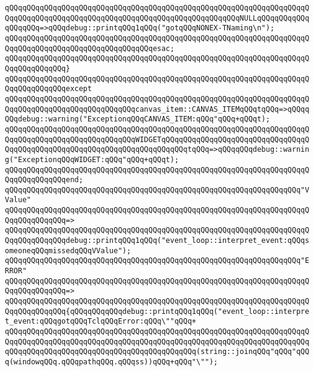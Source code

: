 \verb|qQQqqQQqqQQqqQQqqQQqqQQqqQQqqQQqqQQqqQQqqQQqqQQqqQQqqQQqqQQqqQQqqQQqqQQqqQQqqQQqqQQqqQQqqQQqqQQqqQQqqQQqqQQqqQQqqQQqqQQqqQQqNULLqQQqqQQqqQQqqQQqqQQq=>qQQqdebug::printqQQq1qQQq("gotqQQqNONEX-TNaming\n");|\newline
\verb|qQQqqQQqqQQqqQQqqQQqqQQqqQQqqQQqqQQqqQQqqQQqqQQqqQQqqQQqqQQqqQQqqQQqqQQqqQQqqQQqqQQqqQQqqQQqqQQqqQQqqQQqesac;|\newline
\verb|qQQqqQQqqQQqqQQqqQQqqQQqqQQqqQQqqQQqqQQqqQQqqQQqqQQqqQQqqQQqqQQqqQQqqQQqqQQqqQQqqQQq}|\newline
\verb|qQQqqQQqqQQqqQQqqQQqqQQqqQQqqQQqqQQqqQQqqQQqqQQqqQQqqQQqqQQqqQQqqQQqqQQqqQQqqQQqqQQqexcept|\newline
\verb|qQQqqQQqqQQqqQQqqQQqqQQqqQQqqQQqqQQqqQQqqQQqqQQqqQQqqQQqqQQqqQQqqQQqqQQqqQQqqQQqqQQqqQQqqQQqqQQqqQQqcanvas_item::CANVAS_ITEMqQQqtqQQq=>qQQqqQQqdebug::warning("ExceptionqQQqCANVAS_ITEM:qQQq"qQQq+qQQqt);|\newline
\verb|qQQqqQQqqQQqqQQqqQQqqQQqqQQqqQQqqQQqqQQqqQQqqQQqqQQqqQQqqQQqqQQqqQQqqQQqqQQqqQQqqQQqqQQqqQQqqQQqqQQqWIDGETqQQqqQQqqQQqqQQqqQQqqQQqqQQqqQQqqQQqqQQqqQQqqQQqqQQqqQQqqQQqqQQqqQQqqQQqqQQqtqQQq=>qQQqqQQqdebug::warning("ExceptionqQQqWIDGET:qQQq"qQQq+qQQqt);|\newline
\verb|qQQqqQQqqQQqqQQqqQQqqQQqqQQqqQQqqQQqqQQqqQQqqQQqqQQqqQQqqQQqqQQqqQQqqQQqqQQqqQQqqQQqend;|\newline
\newline
\verb|qQQqqQQqqQQqqQQqqQQqqQQqqQQqqQQqqQQqqQQqqQQqqQQqqQQqqQQqqQQqqQQqqQQq"VValue"|\newline
\verb|qQQqqQQqqQQqqQQqqQQqqQQqqQQqqQQqqQQqqQQqqQQqqQQqqQQqqQQqqQQqqQQqqQQqqQQqqQQqqQQqqQQq=>|\newline
\verb|qQQqqQQqqQQqqQQqqQQqqQQqqQQqqQQqqQQqqQQqqQQqqQQqqQQqqQQqqQQqqQQqqQQqqQQqqQQqqQQqqQQqdebug::printqQQq1qQQq("event_loop::interpret_event:qQQqsomeoneqQQqmissedqQQqVValue");|\newline
\newline
\verb|qQQqqQQqqQQqqQQqqQQqqQQqqQQqqQQqqQQqqQQqqQQqqQQqqQQqqQQqqQQqqQQqqQQq"ERROR"|\newline
\verb|qQQqqQQqqQQqqQQqqQQqqQQqqQQqqQQqqQQqqQQqqQQqqQQqqQQqqQQqqQQqqQQqqQQqqQQqqQQqqQQqqQQq=>|\newline
\verb|qQQqqQQqqQQqqQQqqQQqqQQqqQQqqQQqqQQqqQQqqQQqqQQqqQQqqQQqqQQqqQQqqQQqqQQqqQQqqQQqqQQq{qQQqqQQqqQQqdebug::printqQQq1qQQq("event_loop::interpret_event:qQQqgotqQQqTclqQQqError:qQQq\""qQQq+|\newline
\verb|qQQqqQQqqQQqqQQqqQQqqQQqqQQqqQQqqQQqqQQqqQQqqQQqqQQqqQQqqQQqqQQqqQQqqQQqqQQqqQQqqQQqqQQqqQQqqQQqqQQqqQQqqQQqqQQqqQQqqQQqqQQqqQQqqQQqqQQqqQQqqQQqqQQqqQQqqQQqqQQqqQQqqQQqqQQqqQQqqQQqqQQq(string::joinqQQq"qQQq"qQQq(windowqQQq.qQQqpathqQQq.qQQqss))qQQq+qQQq"\"");|\newline
